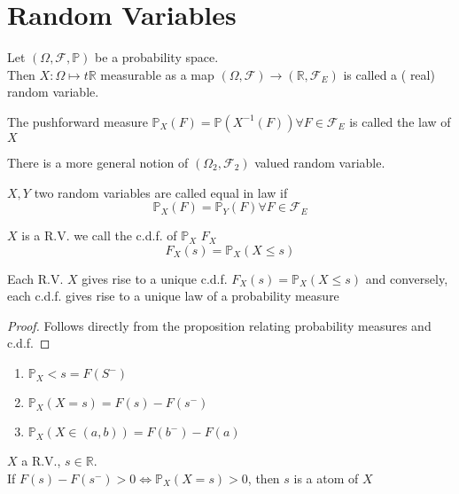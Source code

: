 \documentclass[../main.tex]{subfiles}
\begin{document}
\section{Random Variables}
\begin{defn}
	Let $( \Omega, \mathcal{F}, \mathbb{P}) $ be a probability space.\\
	Then $X: \Omega\mapsto t \mathbb{R}$ measurable as a map $ ( \Omega, \mathcal{F}) \to ( \mathbb{R}, \mathcal{F}_E) $ is called a ( real) random variable.
\end{defn}
The pushforward measure $ \mathbb{P}_X ( F) = \mathbb{P}( X^{-1}( F) ) \forall F \in \mathcal{F}_E$ is called the law of $X$ 
\begin{rmq}
	There is a more general notion of $( \Omega_2, \mathcal{F}_2) $ valued random variable.
\end{rmq}
\begin{defn}[Equality of RV]
	$X,Y$ two random variables are called equal in law if
	\[ 
		\mathbb{P}_X( F) = \mathbb{P}_Y( F) \forall F \in \mathcal{F}_E
	\]
	
\end{defn}
\begin{defn}
$X$ is a R.V. we call the c.d.f. of $\mathbb{P}_X$ $F_X$ 
\[ 
	F_X( s) = \mathbb{P}_X( X \leq s ) 
\]
			
\end{defn}
\begin{propo}
	Each R.V. $X$ gives rise to a unique c.d.f. $F_X( s) = \mathbb{P}_X( X \leq s) $ and conversely, each c.d.f. gives rise to a unique law of a probability measure
\end{propo}
\begin{proof}
Follows directly from the proposition relating probability measures and c.d.f.
\end{proof}
\begin{lemma}
\begin{enumerate}
	\item $\mathbb{P}_X<s = F( S^{-}) $ 
	\item $\mathbb{P}_X( X=s) = F( s) -F( s^{-}) $ 
	\item $ \mathbb{P}_X( X\in ( a,b) ) = F( b^{-}) - F( a) $ 
\end{enumerate}
\end{lemma}
\begin{defn}
$X$ a R.V., $s\in \mathbb{R}$.\\
If $F( s) - F( s^{-}) >0 \iff \mathbb{P}_X( X=s) >0$, then $s$ is a atom of $X$ 
\end{defn}
\end{document}
